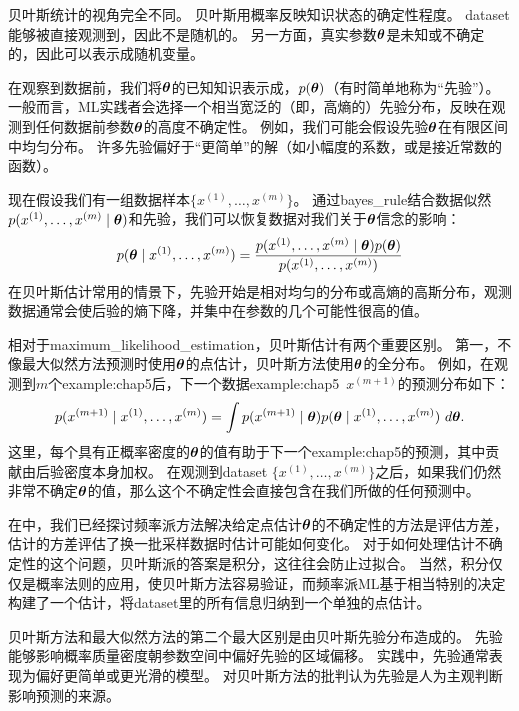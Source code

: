 贝叶斯统计的视角完全不同。
贝叶斯用概率反映知识状态的确定性程度。
\gls{dataset}能够被直接观测到，因此不是随机的。
另一方面，真实参数$\boldsymbol{\theta}$是未知或不确定的，因此可以表示成随机变量。

在观察到数据前，我们将$\boldsymbol{\theta}$的已知知识表示成，$p(\boldsymbol{\theta})$（有时简单地称为``先验''）。
一般而言，\gls{ML}实践者会选择一个相当宽泛的（即，高熵的）先验分布，反映在观测到任何数据前参数$\boldsymbol{\theta}$的高度不确定性。
例如，我们可能会假设先验$\boldsymbol{\theta}$在有限区间中均匀分布。
许多先验偏好于``更简单''的解（如小幅度的系数，或是接近常数的函数）。

现在假设我们有一组数据样本$\{x^{(1)},\dots,x^{(m)}\}$。
通过\gls{bayes_rule}结合数据似然$p(x^{(1)},\dots,x^{(m)} \mid \boldsymbol{\theta})$和先验，我们可以恢复数据对我们关于$\boldsymbol{\theta}$信念的影响：
\begin{equation}
        p(\boldsymbol{\theta} \mid x^{(1)},\dots,x^{(m)}) = 
        \frac{p(x^{(1)},\dots,x^{(m)} \mid \boldsymbol{\theta}) p(\boldsymbol{\theta})}
            {p(x^{(1)},\dots,x^{(m)})}
\end{equation}
在贝叶斯估计常用的情景下，先验开始是相对均匀的分布或高熵的高斯分布，观测数据通常会使后验的熵下降，并集中在参数的几个可能性很高的值。

相对于\gls{maximum_likelihood_estimation}，贝叶斯估计有两个重要区别。
第一，不像最大似然方法预测时使用$\boldsymbol{\theta}$的点估计，贝叶斯方法使用$\boldsymbol{\theta}$的全分布。
例如，在观测到$m$个\gls{example:chap5}后，下一个数据\gls{example:chap5}~$x^{(m+1)}$的预测分布如下：
\begin{equation}
    p(x^{(m+1)} \mid x^{(1)},\dots,x^{(m)}) = 
    \int p(x^{(m+1)} \mid \boldsymbol{\theta}) p(\boldsymbol{\theta} \mid x^{(1)},\dots,x^{(m)})~d\boldsymbol{\theta} .
\end{equation}
这里，每个具有正概率密度的$\boldsymbol{\theta}$的值有助于下一个\gls{example:chap5}的预测，其中贡献由后验密度本身加权。
在观测到\gls{dataset} $\{ x^{(1)},\dots,x^{(m)}\}$之后，如果我们仍然非常不确定$\boldsymbol{\theta}$的值，那么这个不确定性会直接包含在我们所做的任何预测中。


在中，我们已经探讨频率派方法解决给定点估计$\boldsymbol{\theta}$的不确定性的方法是评估方差，估计的方差评估了换一批采样数据时估计可能如何变化。
对于如何处理估计不确定性的这个问题，贝叶斯派的答案是积分，这往往会防止过拟合。
当然，积分仅仅是概率法则的应用，使贝叶斯方法容易验证，而频率派\gls{ML}基于相当特别的决定构建了一个估计，将\gls{dataset}里的所有信息归纳到一个单独的点估计。

贝叶斯方法和最大似然方法的第二个最大区别是由贝叶斯先验分布造成的。
先验能够影响概率质量密度朝参数空间中偏好先验的区域偏移。
实践中，先验通常表现为偏好更简单或更光滑的模型。
对贝叶斯方法的批判认为先验是人为主观判断影响预测的来源。

